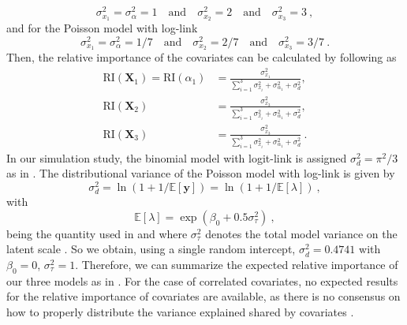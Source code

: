 \begin{equation}
    \sigma_{x_1}^2 = \sigma_{\alpha}^2  = 1 \quad \text{and} \quad \sigma_{x_2}^2 = 2 \quad \text{and} \quad \sigma_{x_3}^2 = 3 \ ,
\end{equation}
and for the Poisson model with log-link
\begin{equation}
    \sigma_{x_1}^2 = \sigma_{\alpha}^2  = 1/7 \quad \text{and} \quad \sigma_{x_2}^2 = 2/7 \quad \text{and} \quad \sigma_{x_3}^2 = 3/7 \ .
\end{equation}
Then, the relative importance of the covariates can be calculated by following  as
\begin{equation}
    \begin{aligned}
        \text{RI}(\mathbf{X}_{1})  = \text{RI}(\alpha_1)  &= \frac{\sigma_{x_1}^2}{\sum_{i=1}^{3}\sigma_{x_i}^2 +\sigma_{\alpha_1}^2  + \sigma_d^2}, \\
        \text{RI}(\mathbf{X}_2) &= \frac{\sigma_{x_3}^2}{\sum_{i=1}^{3}\sigma_{x_i}^2 +\sigma_{\alpha_1}^2 +  \sigma_d^2}, \\
        \text{RI}(\mathbf{X}_3) &= \frac{\sigma_{x_3}^2}{\sum_{i=1}^{3}\sigma_{x_i}^2 +\sigma_{\alpha_1}^2 +  \sigma_d^2} \ .
    \end{aligned}
\end{equation}
In our simulation study, the binomial model with logit-link is assigned $\sigma^2_d=\pi^2/3$ as in . The distributional variance of the Poisson model with log-link is given by 
\begin{equation}
    \sigma_d^2 = \ln (1 + 1/\mathbb{E}[\mathbf{y}]) = \ln (1 + 1/\mathbb{E}[\lambda]) \ ,
\end{equation}
with
\begin{equation}
    \label{eq:lambda}
    \mathbb{E}[\lambda]=\exp\left(\beta_0 + 0.5 \sigma^2_{\tau}\right) \ ,
\end{equation}
being the quantity used in  and where $\sigma^2_{\tau}$ denotes the total model variance on the latent scale \citep{nakagawa2017}. So we obtain, using a single random intercept, $\sigma_{d}^2=0.4741$ with $\beta_0=0$, $\sigma^2_{\tau}=1$. Therefore, we can summarize the expected relative importance of our three models as in . For the case of correlated covariates, no expected results for the relative importance of covariates are available, as there is no consensus on how to properly distribute the variance explained shared by covariates \citep{gromping_relaimpo}.
